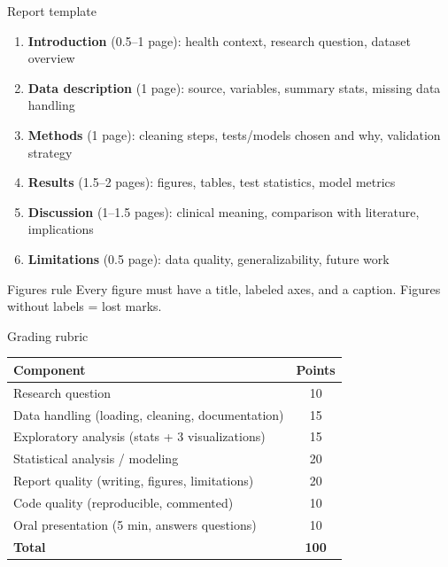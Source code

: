 \documentclass[aspectratio=169,11pt]{beamer}
\begin{document}
\begin{frame}{Report template}
\begin{enumerate}
  \item \textbf{Introduction} (0.5--1 page): health context, research question, dataset overview
  \item \textbf{Data description} (1 page): source, variables, summary stats, missing data handling
  \item \textbf{Methods} (1 page): cleaning steps, tests/models chosen and why, validation strategy
  \item \textbf{Results} (1.5--2 pages): figures, tables, test statistics, model metrics
  \item \textbf{Discussion} (1--1.5 pages): clinical meaning, comparison with literature, implications
  \item \textbf{Limitations} (0.5 page): data quality, generalizability, future work
\end{enumerate}

\begin{alertblock}{Figures rule}
Every figure must have a title, labeled axes, and a caption. Figures without labels = lost marks.
\end{alertblock}
\end{frame}

\begin{frame}{Grading rubric}
\begin{table}
\begin{tabular}{lc}
\toprule
\textbf{Component} & \textbf{Points} \\
\midrule
Research question & 10 \\
Data handling (loading, cleaning, documentation) & 15 \\
Exploratory analysis (stats + 3 visualizations) & 15 \\
Statistical analysis / modeling & 20 \\
Report quality (writing, figures, limitations) & 20 \\
Code quality (reproducible, commented) & 10 \\
Oral presentation (5 min, answers questions) & 10 \\
\midrule
\textbf{Total} & \textbf{100} \\
\bottomrule
\end{tabular}
\end{table}
\end{frame}
\end{document}
